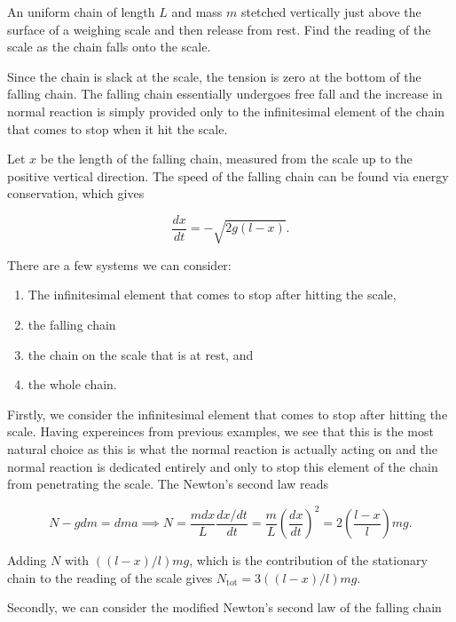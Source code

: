 \documentclass[a4paper,12pt]{report}
\begin{document}
{An uniform chain of length \(L\) and mass \(m\) stetched vertically just above the surface of a weighing scale and then release from rest. Find the reading of the scale as the chain falls onto the scale.}
{Since the chain is slack at the scale, the tension is zero at the bottom of the falling chain. The falling chain essentially undergoes free fall and the increase in normal reaction is simply provided only to the infinitesimal element of the chain that comes to stop when it hit the scale. 

Let \(x\) be the length of the falling chain, measured from the scale up to the positive vertical direction. The speed of the falling chain can be found via energy conservation, which gives 

\begin{equation}
	\frac{dx}{dt} = -\sqrt{2g(l-x)}.  
\end{equation}

There are a few systems we can consider: 

\begin{enumerate}
	\item The infinitesimal element that comes to stop after hitting the scale,
	\item the falling chain
	\item the chain on the scale that is at rest, and
	\item the whole chain.
\end{enumerate}

Firstly, we consider the infinitesimal element that comes to stop after hitting the scale. Having expereinces from previous examples, we see that this is the most natural choice as this is what the normal reaction is actually acting on and the normal reaction is dedicated entirely and only to stop this element of the chain from penetrating the scale. The Newton's second law reads

\begin{equation}
	N - gdm = dma \implies N = \frac{mdx}{L}\frac{dx /dt }{dt} = \frac{m}{L}\left( \frac{dx}{dt}  \right)^2 = 2\left( \frac{l-x}{l}  \right)mg. 
\end{equation}

Adding \(N\) with \(((l-x) /l) mg\), which is the contribution of the stationary chain to the reading of the scale gives \(N_{\text{tot} } = 3 \left( (l-x) /l \right)mg\).   

Secondly, we can consider the modified Newton's second law of the falling chain 

}
\end{document}
